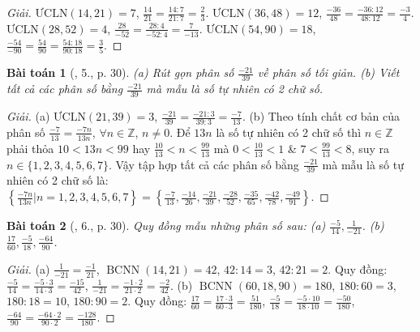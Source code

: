 \documentclass{article}
\newtheorem{baitoan}{Bài toán}
\begin{document}
\begin{proof}[Giải]
	$\mbox{ƯCLN}(14,21) = 7$, $\frac{14}{21} = \frac{14:7}{21:7} = \frac{2}{3}$. $\mbox{ƯCLN}(36,48) = 12$, $\frac{-36}{48} = \frac{-36:12}{48:12} = \frac{-3}{4}$. $\mbox{ƯCLN}(28,52) = 4$, $\frac{28}{-52} = \frac{28:4}{-52:4} = \frac{7}{-13}$. $\mbox{ƯCLN}(54,90) = 18$, $\frac{-54}{-90} = \frac{54}{90} = \frac{54:18}{90:18} = \frac{3}{5}$.
\end{proof}

\begin{baitoan}[\cite{SGK_Toan_6_Canh_Dieu_tap_2}, 5., p. 30]
	(a) Rút gọn phân số $\frac{-21}{39}$ về phân số tối giản. (b) Viết tất cả các phân số bằng $\frac{-21}{39}$ mà mẫu là số tự nhiên có 2 chữ số.
\end{baitoan}

\begin{proof}[Giải]
	(a) $\mbox{ƯCLN}(21,39) = 3$, $\frac{-21}{39} = \frac{-21:3}{39:3} = \frac{-7}{13}$. (b) Theo tính chất cơ bản của phân số $\frac{-7}{13} = \frac{-7n}{13n}$, $\forall n\in\mathbb{Z}$, $n\ne0$. Để $13n$ là số tự nhiên có 2 chữ số thì $n\in\mathbb{Z}$ phải thỏa $10 < 13n < 99$ hay $\frac{10}{13} < n < \frac{99}{13}$ mà $0< \frac{10}{13} < 1$ \& $7 < \frac{99}{13} < 8$, suy ra $n\in\{1,2,3,4,5,6,7\}$. Vậy tập hợp tất cả các phân số bằng $\frac{-21}{39}$ mà mẫu là số tự nhiên có 2 chữ số là: $\left\{\frac{-7n}{13n}|n = 1,2,3,4,5,6,7\right\} = \left\{\frac{-7}{13},\frac{-14}{26},\frac{-21}{39},\frac{-28}{52},\frac{-35}{65},\frac{-42}{78},\frac{-49}{91}\right\}$.
\end{proof}

\begin{baitoan}[\cite{SGK_Toan_6_Canh_Dieu_tap_2}, 6., p. 30]
	Quy đồng mẫu những phân số sau: (a) $\frac{-5}{14},\frac{1}{-21}$. (b) $\frac{17}{60},\frac{-5}{18},\frac{-64}{90}$.
\end{baitoan}

\begin{proof}[Giải]
	(a) $\frac{1}{-21} = \frac{-1}{21}$, $\operatorname{BCNN}(14,21) = 42$, $42:14 = 3$, $42:21 = 2$. Quy đồng: $\frac{-5}{14} = \frac{-5\cdot3}{14\cdot3} = \frac{-15}{42}$, $\frac{1}{-21} = \frac{-1\cdot2}{21\cdot2} = \frac{-2}{42}$. (b) $\operatorname{BCNN}(60,18,90) = 180$, $180:60 = 3$, $180:18 = 10$, $180:90 = 2$. Quy đồng: $\frac{17}{60} = \frac{17\cdot3}{60\cdot3} = \frac{51}{180}$, $\frac{-5}{18} = \frac{-5\cdot10}{18\cdot10} = \frac{-50}{180}$, $\frac{-64}{90} = \frac{-64\cdot2}{90\cdot2} = \frac{-128}{180}$.
\end{proof}
\end{document}
